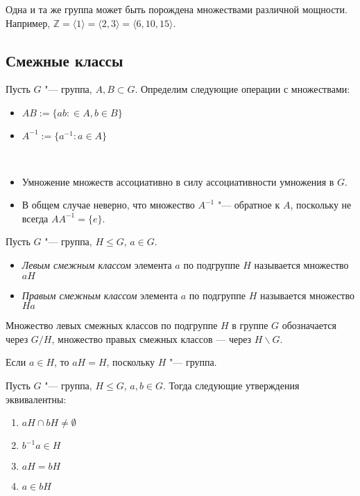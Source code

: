 \begin{note}
	Одна и та же группа может быть порождена множествами различной мощности. Например, $\mathbb{Z} = \langle 1\rangle = \langle 2, 3\rangle = \langle 6, 10, 15\rangle$.
\end{note}

\subsection{Смежные классы}

\begin{definition}
	Пусть $G$ "--- группа, $A, B \subset G$. Определим следующие операции с множествами:
	\begin{itemize}
		\item $AB := \{ab: \in A, b \in B\}$
		\item $A^{-1} := \{a^{-1}: a\in A\}$
	\end{itemize}
\end{definition}

\begin{note}~
	\begin{itemize}
		\item Умножение множеств ассоциативно в силу ассоциативности умножения в $G$.
		\item В общем случае неверно, что множество $A^{-1}$ "--- обратное к $A$, поскольку не всегда $AA^{-1} = \{e\}$.
	\end{itemize}
\end{note}

\begin{definition}
	Пусть $G$ "--- группа, $H \le G$, $a \in G$.
	\begin{itemize}
		\item \textit{Левым смежным классом} элемента $a$ по подгруппе $H$ называется множество $aH$
		\item \textit{Правым смежным классом} элемента $a$ по подгруппе $H$ называется множество $Ha$
	\end{itemize}

	Множество левых смежных классов по подгруппе $H$ в группе $G$ обозначается через $G/H$, множество правых смежных классов --- через $H\backslash G$.
\end{definition}

\begin{note}
	Если $a \in H$, то $aH = H$, поскольку $H$ "--- группа.
\end{note}

\begin{proposition}
	Пусть $G$ "--- группа, $H \le G$, $a, b \in G$. Тогда следующие утверждения эквивалентны:
	\begin{enumerate}
		\item $aH \cap bH \ne \emptyset$
		\item $b^{-1}a \in H$
		\item $aH = bH$
		\item $a \in bH$
	\end{enumerate}
\end{proposition}


